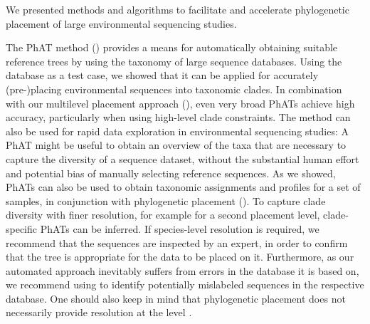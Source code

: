 We presented methods and algorithms to facilitate and accelerate
phylogenetic placement of large environmental sequencing studies. %

The \acf{PhAT} method () provides a means
for automatically obtaining suitable reference trees by using the taxonomy of large sequence databases.
Using the  database as a test case,
we showed that it can be applied for accurately (pre-)placing environmental sequences into taxonomic clades.
In combination with our multilevel placement approach (),
even very broad \acp{PhAT} achieve high accuracy, particularly when using high-level clade constraints.
The method can also be used for rapid data exploration in environmental sequencing studies:
A \ac{PhAT} might be useful to obtain an overview of the taxa that are necessary to capture the diversity of a sequence dataset,
without the substantial human effort and potential bias of manually selecting reference sequences.
As we showed, \acp{PhAT} can also be used to obtain taxonomic assignments and profiles for a set of samples,
in conjunction with phylogenetic placement ().
To capture clade diversity with finer resolution, for example for a second placement level,
clade-specific \acp{PhAT} can be inferred.
If species-level resolution is required, we recommend that the sequences are inspected by an expert,
in order to confirm that the tree is appropriate for the data to be placed on it.
Furthermore, as our automated approach inevitably suffers from errors in the database it is based on,
we recommend using  \cite{Kozlov2016}
to identify potentially mislabeled sequences in the respective database.
One should also keep in mind that phylogenetic placement
does not necessarily provide resolution at the  level \cite{Dunthorn2014}.

